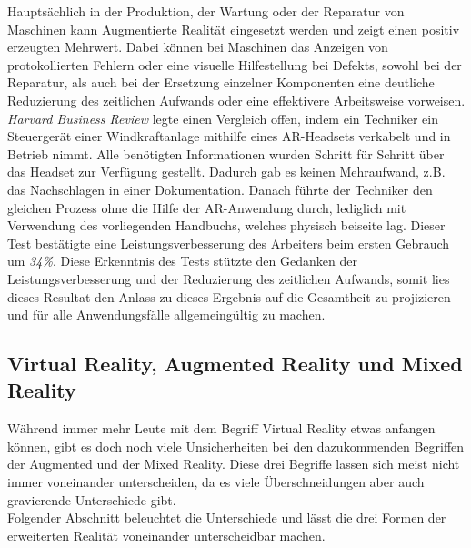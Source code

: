 Hauptsächlich in der Produktion, der Wartung oder der Reparatur von Maschinen kann Augmentierte Realität eingesetzt werden und zeigt einen 
positiv erzeugten Mehrwert. Dabei können bei Maschinen das Anzeigen von protokollierten Fehlern oder eine visuelle Hilfestellung bei Defekts, sowohl bei der 
Reparatur, als auch bei der Ersetzung einzelner Komponenten eine deutliche Reduzierung des zeitlichen Aufwands oder eine effektivere Arbeitsweise 
vorweisen. 
\\
\textit{Harvard Business Review} legte einen Vergleich offen, indem ein Techniker ein Steuergerät einer Windkraftanlage mithilfe 
eines AR-Headsets verkabelt und in Betrieb nimmt. Alle benötigten Informationen wurden Schritt für Schritt über das Headset zur Verfügung 
gestellt. Dadurch gab es keinen Mehraufwand, z.B. das Nachschlagen in einer Dokumentation. Danach führte der Techniker den gleichen Prozess 
ohne die Hilfe der AR-Anwendung durch, lediglich mit Verwendung des vorliegenden Handbuchs, welches physisch beiseite lag.
Dieser Test bestätigte eine Leistungsverbesserung des Arbeiters beim ersten Gebrauch um \textit{34\%}.\cite{harvardbr.2017m} Diese Erkenntnis 
des Tests stützte den Gedanken der Leistungsverbesserung und der Reduzierung des zeitlichen Aufwands, somit lies dieses Resultat den 
Anlass zu dieses Ergebnis auf die Gesamtheit zu projizieren und für alle Anwendungsfälle allgemeingültig zu machen. 


\subsection{Virtual Reality, Augmented Reality und Mixed Reality}
Während immer mehr Leute mit dem Begriff Virtual Reality etwas anfangen können, gibt es doch noch viele Unsicherheiten bei den dazukommenden 
Begriffen der Augmented und der Mixed Reality. Diese drei Begriffe lassen sich meist nicht immer voneinander unterscheiden, da es viele 
Überschneidungen aber auch gravierende Unterschiede gibt. 
\\ 
Folgender Abschnitt beleuchtet die Unterschiede und lässt die drei Formen der erweiterten Realität voneinander unterscheidbar machen.
